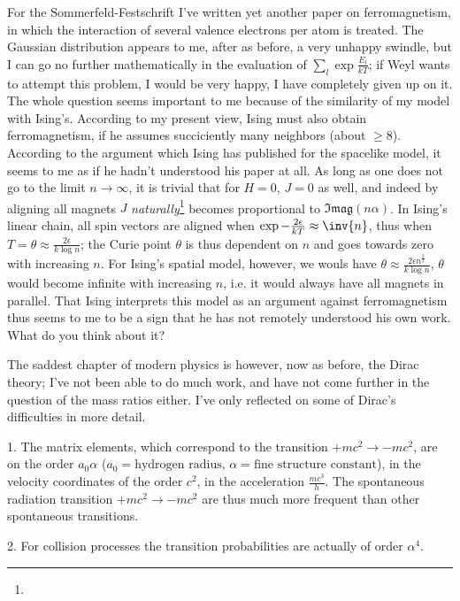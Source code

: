 \documentclass{article}
\newcommand{\sumX}[1]{\underset{#1}{\sum}}
\begin{document}
For the Sommerfeld-Festschrift I've written yet another paper on ferromagnetism, in which the interaction of several valence electrons per atom is treated. The Gaussian distribution appears to me, after as before, a very unhappy swindle, but I can go no further mathematically in the evaluation of $\sumX{l}\exp{\frac{E_l}{kT}}$; if Weyl wants to attempt this problem, I would be very happy, I have completely given up on it. The whole question seems important to me because of the similarity of my model with Ising's. According to my present view, Ising must also obtain ferromagnetism, if he assumes succiciently many neighbors (about $\geq 8$). According to the argument which Ising has published for the spacelike model, it seems to me as if he hadn't understood his paper at all. As long as one does not go to the limit $n \to \infty$, it is trivial that for $H=0$, $J=0$ as well, and indeed by aligning all magnets $J$ \textit{naturally}\footnote{} becomes proportional to $\mathfrak{Imag}(n\alpha)$. In Ising's linear chain, all spin vectors are aligned when $\exp{-\frac{2\epsilon}{kT}} \approx \inv{n}$, thus when $T=\theta \approx \frac{2\epsilon}{k\log{n}}$; the Curie point $\theta$ is thus dependent on $n$ and goes towards zero with increasing $n$. For Ising's  spatial model, however, we wouls have $\theta \approx \frac{2\epsilon n^{\frac{2}{3}}}{k\log{n}}$, $\theta$ would become infinite with increasing $n$, i.e. it would always have all magnets in parallel. That Ising interprets this model as an argument against ferromagnetism thus seems to me to be a sign that he has not remotely understood his own work. What do you think about it?

The saddest chapter of modern physics is however, now as before, the Dirac theory; I've not been able to do much  work, and have not come further in the question of the mass ratios either. I've only reflected on some of Dirac's difficulties in more detail.

1. The matrix elements, which correspond to the transition $+mc^2 \to -mc^2$, are  on the order $a_0 \alpha$ ($a_0 = \text{hydrogen radius}$, $\alpha = \text{fine structure constant}$), in the velocity coordinates of the order $c^2$, in the acceleration $\frac{mc^3}{h}$. The spontaneous radiation transition $+mc^2 \to -mc^2$ are thus much more frequent than other spontaneous transitions.

2. For collision processes the transition probabilities are actually of order $\alpha^4$.
\end{document}
